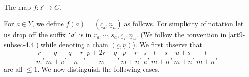 \subsection{}\label{art9-subsec-8.3}

The map $f : Y \rightarrow \overline{C}$.

For $a \in Y$, we define $f(a)= (\overline{\underline{c}_{a}, \underline{n}_{a}})$ as follows. For simplicity of notation let us drop off the suffix $`a'$ is in $r_{a}, \cdots , s_{a}, \underline{c}_{a}, \underline{n}_{a}$. (We follow the
convention in \ref{art9-subsec-4.4}) while denoting a chain $(\underline{c}, \underline{n})$). We first observe that
$$
\frac{r}{m}, \frac{q}{m+n}, \frac{q-r}{n}, \frac{p+2r-q}{m}, \frac{p+r}{m+n}, \frac{s}{n}, \frac{t-s}{m+n}, \frac{u+s}{m+n}, \frac{t}{m+n},
$$ 
are all $\leq 1$. We now distinguish the following cases.

\setcounter{case}{0}
\begin{case}

\end{case}

